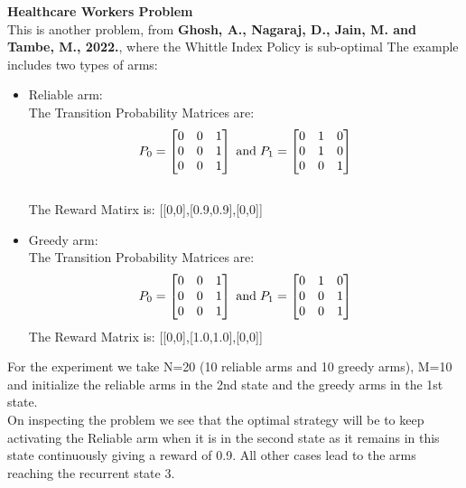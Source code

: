 \documentclass{slides}
\begin{document}
{{\begin{center}
\end{center}
\newpage
\textbf{Healthcare Workers Problem}\\
This is another problem, from \textbf{Ghosh, A., Nagaraj, D., Jain, M. and Tambe, M., 2022.}, where the Whittle Index Policy is sub-optimal
The example includes two types of arms:
\begin{itemize}
\vspace{-2cm}
    \item Reliable arm:\\
    The Transition Probability Matrices are:\\
    \begin{align*}
    P_0=
    \begin{bmatrix}
    0 & 0 & 1\\
    0 & 0 & 1\\
    0 & 0 & 1
    \end{bmatrix}
    \hspace{1mm} \text{and} \hspace{1mm}
    P_1=
    \begin{bmatrix}
    0& 1 & 0\\
    0 & 1 & 0\\
    0 & 0&1
    \end{bmatrix}
    \end{align*}\\
    The Reward Matirx is: [[0,0],[0.9,0.9],[0,0]]
    \newpage
    \item Greedy arm:\\
    The Transition Probability Matrices are:\\
    \begin{align*}
    P_0=
    \begin{bmatrix}
    0 & 0 & 1\\
    0 & 0 & 1\\
    0 & 0 & 1
    \end{bmatrix}
    \hspace{1mm} \text{and} \hspace{1mm}
    P_1=
    \begin{bmatrix}
    0& 1 & 0\\
    0 & 0 & 1\\
    0 & 0&1
    \end{bmatrix}
    \end{align*}
    The Reward Matrix is: [[0,0],[1.0,1.0],[0,0]]
\end{itemize}
For the experiment we take N=20 (10 reliable arms and 10 greedy arms), M=10 and initialize the reliable arms in the 2nd state and the greedy arms in the 1st state.\\
\newpage
On inspecting the problem we see that the optimal strategy will be to keep activating the Reliable arm when it is in the second state as it remains in this state continuously giving a reward of 0.9. All other cases lead to the arms reaching the recurrent state 3.\\
\begin{center}
    

\end{center}}}
\end{document}
